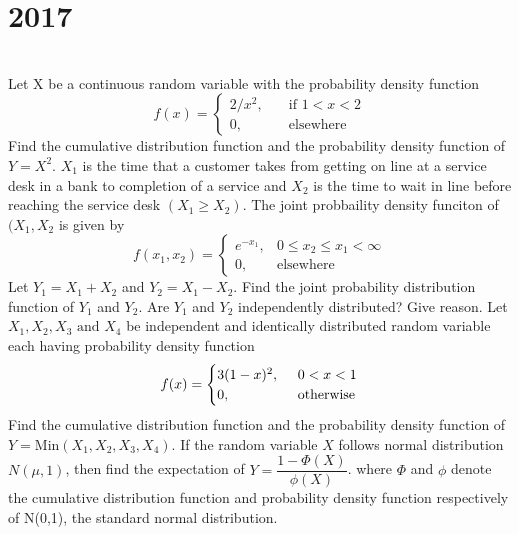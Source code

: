 \section*{2017}
\vspace{-.5cm}
\hrulefill \smallskip\\
 Let X be a continuous random variable with the probability density function \[ f(x) = \begin{cases} 2/x^2, \quad &\text{if } 1<x<2 \\ 0,  & \text{elsewhere} \end{cases}\] Find the cumulative distribution function and the probability density function of $Y=X^2$.
\myline
{} $X_1$ is the time that a customer takes from getting on line at a service desk in a bank to completion of a service and $X_2$ is the time to wait in line before reaching the service desk $(X_1 \geq X_2)$. The joint probbaility density funciton of $(X_1, X_2$ is given by \[ f(x_1,x_2) = \begin{cases} e^{-x_1},  & 0\leq x_2\leq x_1 < \infty  \\ 0, &\text{elsewhere} \end{cases}\] Let $Y_1 = X_1 + X_2$ and $Y_2 = X_1 - X_2$. Find the joint probability distribution function of $Y_1$ and $Y_2$. Are $Y_1$ and $Y_2$ independently distributed? Give reason.
\myline
{} Let $X_1,X_2,X_3\text{ and }X_4$ be independent and identically distributed random variable each having probability density function \[ f(x) = \begin{cases} 3(1-x)^2, \enskip &0< x<1 \\ 0, &\text{otherwise} \end{cases} \] Find the cumulative distribution function and the probability density function of $Y=\text{Min}(X_1,X_2,X_3,X_4)$.
\myline
{}  If the random variable $X$ follows normal distribution $N(\mu,1)$, then find the expectation of $Y = \dfrac{1 - \Phi(X)}{\phi(X)}$. where $\Phi$ and $\phi$ denote the cumulative distribution function and probability density function respectively of N(0,1), the standard normal distribution.